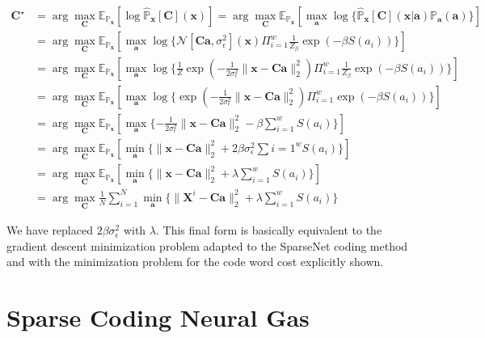 \documentclass[12pt,a4paper,oneside,english]{UPBThesis}
\begin{document}
\begin{align*}
\textbf{C}^\star & = \arg\max_\textbf{C} \mathbb{E}_{\mathbb{P}_\textbf{x}} [ \log{\hat{\mathbb{P}}_\textbf{x}[\textbf{C}](\textbf{x})} ] = \arg\max_\textbf{C} \mathbb{E}_{\mathbb{P}_\textbf{x}} [ \max_\textbf{a} \log \{ {\hat{\mathbb{P}}_\textbf{x}[\textbf{C}](\textbf{x}\left|\right.\textbf{a})\mathbb{P}_\textbf{a}(\textbf{a})} \} ] \\
& = \arg\max_\textbf{C} \mathbb{E}_{\mathbb{P}_\textbf{x}} [ \max_\textbf{a} \log{ \{ \mathcal{N}[\textbf{C}\textbf{a},\sigma_\epsilon^2](\textbf{x}) \Pi_{i=1}^w{\frac{1}{Z_\beta} \exp(-\beta S(a_i))}} \} ] \\
& = \arg\max_\textbf{C} \mathbb{E}_{\mathbb{P}_\textbf{x}} [ \max_\textbf{a} \log{ \{ \frac{1}{Z} \exp \left( -\frac{1}{2\sigma_\epsilon^2} \| \textbf{x} - \textbf{C}\textbf{a} \|_2^2 \right) \Pi_{i=1}^w{\frac{1}{Z_\beta} \exp(-\beta S(a_i))} \} } ] \\
& = \arg\max_\textbf{C} \mathbb{E}_{\mathbb{P}_\textbf{x}} [ \max_\textbf{a} \log{ \{ \exp \left( -\frac{1}{2\sigma_\epsilon^2} \| \textbf{x} - \textbf{C}\textbf{a} \|_2^2 \right) \Pi_{i=1}^w{\exp(-\beta S(a_i))} \} } ] \\
& = \arg\max_\textbf{C} \mathbb{E}_{\mathbb{P}_\textbf{x}} [ \max_\textbf{a} \{ - \frac{1}{2\sigma_\epsilon^2} \| \textbf{x} - \textbf{C}\textbf{a} \|_2^2 - \beta \sum_{i=1}^w{S(a_i)} \} ] \\
& = \arg\max_\textbf{C} \mathbb{E}_{\mathbb{P}_\textbf{x}} [ \min_\textbf{a} \{ \| \textbf{x} - \textbf{C}\textbf{a} \|_2^2 + 2\beta\sigma_\epsilon^2\sum{i=1}^wS(a_i) \} ] \\
& = \arg\max_\textbf{C} \mathbb{E}_{\mathbb{P}_\textbf{x}} [ \min_\textbf{a} \{ \| \textbf{x} - \textbf{C}\textbf{a} \|_2^2 + \lambda\sum_{i=1}^wS(a_i) \} ] \\
& = \arg\max_\textbf{C} \frac{1}{N} \sum_{i=1}^N \min_\textbf{a} \{ \| \textbf{X}^i - \textbf{C}\textbf{a} \|_2^2 + \lambda\sum_{i=1}^wS(a_i) \}
\end{align*}

We have replaced $2\beta\sigma_\epsilon^2$ with $\lambda$. This final form is basically equivalent to the gradient descent minimization problem adapted to the SparseNet coding method and with the minimization problem for the code word cost explicitly shown.

\section{Sparse Coding Neural Gas}
\label{sec:SparseCodingNeuralGas}
\end{document}
